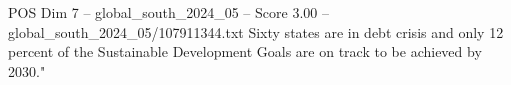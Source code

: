 \begin{textsample}{POS Dim 7 – global\_south\_2024\_05 – Score 3.00 – global\_south\_2024\_05/107911344.txt}
Sixty states are in debt crisis and only 12 percent of the Sustainable Development Goals are on track to be achieved by 2030."

\end{textsample}
